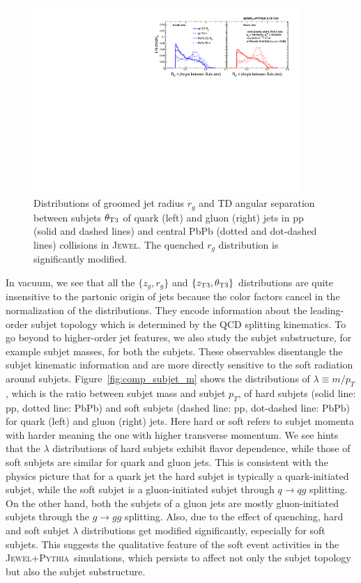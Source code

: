 \documentclass[notoc]{JHEP3}
\newcommand{\jwpy}{\textsc{Jewel+Pythia}~}
\begin{document}
\begin{figure}[t]
	   \centering
	   \includegraphics[width=0.9\textwidth]{plots/Comp_rg.pdf}
	   \caption{Distributions of groomed jet radius $r_g$ and TD angular separation between subjets $\theta_{\rm T3}$ of quark (left) and gluon (right) jets in pp (solid and dashed lines) and central PbPb (dotted and dot-dashed lines) collisions in \textsc{Jewel}. The quenched $r_{g}$ distribution is significantly modified.}
\label{fig:comp_rg}
\end{figure}

In vacuum, we see that all the $\{z_g,r_g\}$ and $\{z_{\rm T3},\theta_{\rm T3}\}$ distributions are quite insensitive to the partonic origin of jets because the color factors cancel in the normalization of the distributions. They encode information about the leading-order subjet topology which is determined by the QCD splitting kinematics. To go beyond to higher-order jet features, we also study the subjet substructure, for example subjet masses, for both the subjets. These observables disentangle the subjet kinematic information and are more directly sensitive to the soft radiation around subjets. Figure~\ref{fig:comp_subjet_m} shows the distributions of $\lambda\equiv m/p_T$, which is the ratio between subjet mass and subjet $p_T$, of hard subjets (solid line: pp, dotted line: PbPb) and soft subjets (dashed line: pp, dot-dashed line: PbPb) for quark (left) and gluon (right) jets. Here hard or soft refers to subjet momenta with harder meaning the one with higher transverse momentum. We see hints that the $\lambda$ distributions of hard subjets exhibit flavor dependence, while those of soft subjets are similar for quark and gluon jets. This is consistent with the physics picture that for a quark jet the hard subjet is typically a quark-initiated subjet, while the soft subjet is a gluon-initiated subjet through $q\rightarrow qg$ splitting. On the other hand, both the subjets of a gluon jets are mostly gluon-initiated subjets through the $g\rightarrow gg$ splitting. Also, due to the effect of quenching, hard and soft subjet $\lambda$ distributions get modified significantly, especially for soft subjets. This suggests the qualitative feature of the soft event activities in the \jwpy simulations, which persists to affect not only the subjet topology but also the subjet substructure.
\end{document}
